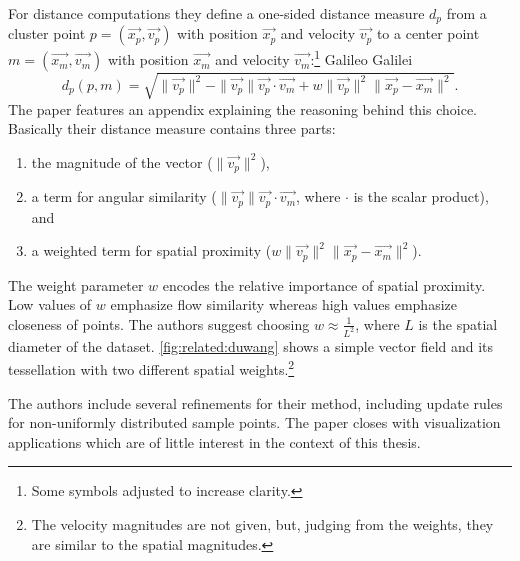 For distance computations they define a one-sided distance measure $d_p$ from a cluster point $p=(\vec{x_p}, \vec{v_p})$ with position $\vec{x_p}$ and velocity $\vec{v_p}$ to a center point $m=(\vec{x_m}, \vec{v_m})$ with position $\vec{x_m}$ and velocity $\vec{v_m}$:\footnote{Some symbols adjusted to increase clarity.}
%
{Galileo Galilei}
%
\begin{equation}
\label{eqn:related:CVT-distance}
	d_p(p,m) = \sqrt{\|\vec{v_p}\|^2 - \|\vec{v_p}\|\vec{v_p}\cdot\vec{v_m} 
	           + w \|\vec{v_p}\|^2 \|\vec{x_p} - \vec{x_m}\|^2}.
\end{equation} 
%
The paper features an appendix explaining the reasoning behind this choice. Basically their distance measure contains three parts:
%
\begin{enumerate}
  \item the magnitude of the vector ($\|\vec{v_p}\|^2$),
  \item a term for angular similarity ($\|\vec{v_p}\|\vec{v_p}\cdot\vec{v_m}$, where $\cdot$ is the scalar product), and 
  \item a weighted term for spatial proximity ($w \|\vec{v_p}\|^2 \|\vec{x_p} - \vec{x_m}\|^2$).
\end{enumerate}  

The weight parameter $w$ encodes the relative importance of spatial proximity. Low values of $w$ emphasize flow similarity whereas high values emphasize closeness of points. The authors suggest choosing $w \approx \frac{1}{L^2}$, where $L$ is the spatial diameter of the dataset. \autoref{fig:related:duwang} shows a simple \twod vector field and its tessellation with two different spatial weights.\footnote{The velocity magnitudes are not given, but, judging from the weights, they are similar to the spatial magnitudes.}

The authors include several refinements for their method, including update rules for non-uniformly distributed sample points. The paper closes with visualization applications which are of little interest in the context of this thesis.

